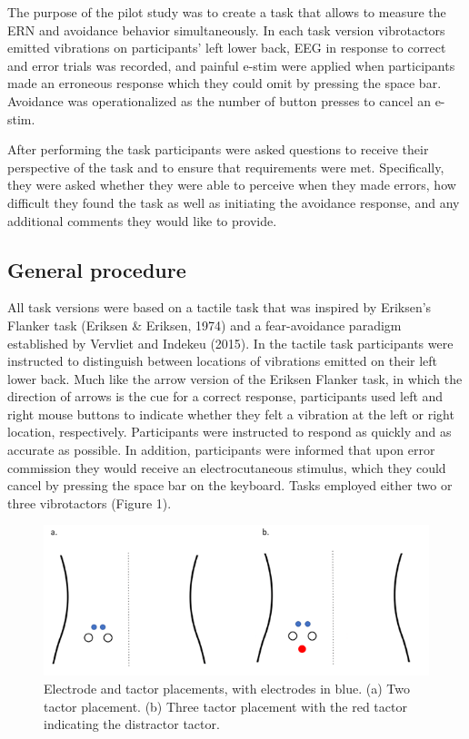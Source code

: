 \documentclass[twocolumn, serif, authordate, review]{jote-article}
\begin{document}
The purpose of the pilot study was to create a task that allows to measure the ERN and avoidance behavior simultaneously. In each task version vibrotactors emitted vibrations on participants' left lower back, EEG in response to correct and error trials was recorded, and painful e-stim were applied when participants made an erroneous response which they could omit by pressing the space bar. Avoidance was operationalized as the number of button presses to cancel an e-stim.

After performing the task participants were asked questions to receive their perspective of the task and to ensure that requirements were met. Specifically, they were asked whether they were able to perceive when they made errors, how difficult they found the task as well as initiating the avoidance response, and any additional comments they would like to provide.

{}
\subsection*{General procedure} 
\gotoreview
\label{sec:procedure}

\noindent All task versions were based on a tactile task that was inspired by Eriksen's Flanker task (Eriksen \& Eriksen, 1974) and a fear-avoidance paradigm established by Vervliet and Indekeu (2015). In the tactile task participants were instructed to distinguish between locations of vibrations emitted on their left lower back. Much like the arrow version of the Eriksen Flanker task, in which the direction of arrows is the cue for a correct response, participants used left and right mouse buttons to indicate whether they felt a vibration at the left or right location, respectively. Participants were instructed to respond as quickly and as accurate as possible. In addition, participants were informed that upon error commission they would receive an electrocutaneous stimulus, which they could cancel by pressing the space bar on the keyboard. Tasks employed either two or three vibrotactors (Figure 1).~


\begin{figure}
    \centering
    \includegraphics[width=\columnwidth]{articles/empirical/traxler/Figure 1_Trial and Error (-Related Negativity) (5).png}
    \caption{Electrode and tactor placements, with electrodes in blue. (a) Two tactor placement. (b) Three tactor placement with the red tactor indicating the distractor tactor.}
    \label{fig:1}
\end{figure}
\end{document}
